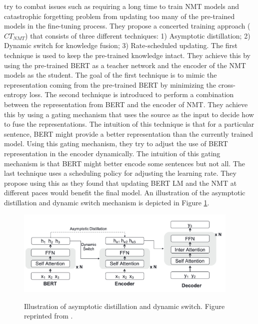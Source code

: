  try to combat issues such as requiring a long time to train NMT models and catastrophic forgetting problem from updating too many of the pre-trained models in the fine-tuning process. They propose a concerted training approach ($CT_{NMT}$) that consists of three different techniques: 1) Asymptotic distillation; 2) Dynamic switch for knowledge fusion; 3) Rate-scheduled updating. The first technique is used to keep the pre-trained knowledge intact. They achieve this by using the pre-trained BERT as a teacher network and the encoder of the NMT models as the student. The goal of the first technique is to mimic the representation coming from the pre-trained BERT by minimizing the cross-entropy loss. The second technique is introduced to perform a combination between the representation from BERT and the encoder of NMT. They achieve this by using a gating mechanism that uses the source as the input to decide how to fuse the representations. The intuition of this technique is that for a particular sentence, BERT might provide a better representation than the currently trained model. Using this gating mechanism, they try to adjust the use of BERT representation in the encoder dynamically. The intuition of this gating mechanism is that BERT might better encode some sentences but not all. The last technique uses a scheduling policy for adjusting the learning rate. They propose using this as they found that updating BERT LM and the NMT at different paces would benefit the final model. An illustration of the asymptotic distillation and dynamic switch mechanism is depicted in Figure \ref{img:ctnmt}.

\begin{figure}[h]
    {\includegraphics[width=0.95\textwidth]{img/ctnmt.png}}
    \centering
    \caption{Illustration of asymptotic distillation and dynamic switch. Figure reprinted from .}
    \label{img:ctnmt}
\end{figure}

